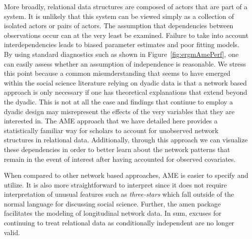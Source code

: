 \documentclass[9pt,twocolumn,twoside,lineno]{pnas-new}
\newcommand{\pkg}[1]{{\fontseries{b}\selectfont #1}}
\begin{document}
More broadly, relational data structures are composed of actors that are part of a system. It is unlikely that this system can be viewed simply as a collection of isolated actors or pairs of actors. The assumption  that dependencies between observations occur can at the very least be examined. Failure to take into account interdependencies leads to biased parameter estimates and poor fitting models. By using standard diagnostics such as shown in Figure~\ref{fig:ergmAmePerf}, one can easily assess whether an assumption of independence is reasonable. We stress this point because a common misunderstanding that seems to have emerged within the social science literature relying on dyadic data is that a network based approach is only necessary if one has theoretical explanations that extend beyond the dyadic. This is not at all the case and findings that continue to employ a dyadic design may misrepresent the effects of the very variables that they are interested in. The AME approach that we have detailed here provides a statistically familiar way for scholars to account for unobserved network structures in relational data. Additionally, through this approach we can visualize these dependencies in order to better learn about the network patterns that remain in the event of interest after having accounted for observed covariates.

When compared to other network based approaches, AME is easier to specify and utilize. It is also more straightforward to interpret since it does not require interpretation of unusual features such as \textit{three-stars} which fall outside of the normal language for discussing social science. Further, the \pkg{amen} package facilitates the modeling of longitudinal network data. In sum, excuses for continuing to treat relational data as conditionally independent are no longer valid.


\showacknow %

\pnasbreak

% 

% 
\end{document}
